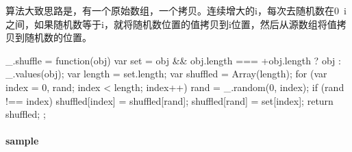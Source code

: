 算法大致思路是，有一个原始数组，一个拷贝。连续增大的i，每次去随机数在0~i之间，如果随机数等于i，就将随机数位置的值拷贝到i位置，然后从源数组将值拷贝到随机数的位置。

\begin{JavaScript}
  _.shuffle = function(obj) {
    var set = obj && obj.length === +obj.length ? obj : _.values(obj);
    var length = set.length;
    var shuffled = Array(length);
    for (var index = 0, rand; index < length; index++) {
      rand = _.random(0, index);
      if (rand !== index) shuffled[index] = shuffled[rand];
      shuffled[rand] = set[index];
    }
    return shuffled;
  };
\end{JavaScript}


\paragraph{sample}

